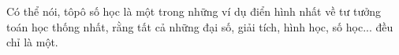 \begin{multicols}{2}
	 Có thể nói, tôpô số học là một trong những ví dụ điển hình nhất về tư tưởng toán học thống nhất, rằng tất cả những đại số, giải tích, hình học, số học... đều chỉ là một.
\end{multicols}